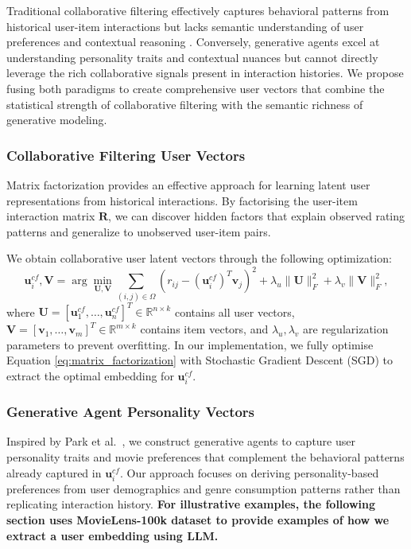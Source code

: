 \documentclass[acmsmall]{acmart}
\begin{document}
Traditional collaborative filtering effectively captures behavioral patterns from historical user-item interactions but lacks semantic understanding of user preferences and contextual reasoning \cite{wang2025mitigating}. Conversely, generative agents excel at understanding personality traits and contextual nuances but cannot directly leverage the rich collaborative signals present in interaction histories. We propose fusing both paradigms to create comprehensive user vectors that combine the statistical strength of collaborative filtering with the semantic richness of generative modeling.

\subsubsection{Collaborative Filtering User Vectors}
\label{sec:cf_vectors}

Matrix factorization provides an effective approach for learning latent user representations from historical interactions. By factorising the user-item interaction matrix $\mathbf{R}$, we can discover hidden factors that explain observed rating patterns and generalize to unobserved user-item pairs.

We obtain collaborative user latent vectors through the following optimization:
\begin{equation}
\mathbf{u}^{cf}_i, \mathbf{V} = \arg\min_{\mathbf{U}, \mathbf{V}} \sum_{(i,j) \in \Omega} \left(r_{ij} - (\mathbf{u}^{cf}_i)^T \mathbf{v}_j\right)^2 + \lambda_u \|\mathbf{U}\|^2_F + \lambda_v \|\mathbf{V}\|^2_F,
\label{eq:matrix_factorization}
\end{equation}
where $\mathbf{U} = [\mathbf{u}^{cf}_1, \ldots, \mathbf{u}^{cf}_n]^T \in \mathbb{R}^{n \times k}$ contains all user vectors, $\mathbf{V} = [\mathbf{v}_1, \ldots, \mathbf{v}_m]^T \in \mathbb{R}^{m \times k}$ contains item vectors, and $\lambda_u, \lambda_v$ are regularization parameters to prevent overfitting. In our implementation, we fully optimise Equation \ref{eq:matrix_factorization} with Stochastic Gradient Descent (SGD) \cite{baltrunas2011incarmusic} to extract the optimal embedding for $\mathbf{u}^{cf}_i$.

\subsubsection{Generative Agent Personality Vectors}
\label{sec:gen_vectors}

Inspired by Park et al.~\cite{park2023generative}, we construct generative agents to capture user personality traits and movie preferences that complement the behavioral patterns already captured in $\mathbf{u}^{cf}_i$. Our approach focuses on deriving personality-based preferences from user demographics and genre consumption patterns rather than replicating interaction history. \textbf{For illustrative examples, the following section uses MovieLens-100k dataset to provide examples of how we extract a user embedding using LLM.} 
\end{document}
